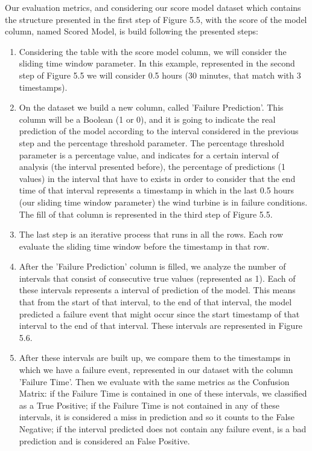 Our evaluation metrics, and considering our score model dataset which contains the structure presented in the first step of Figure 5.5, with the score of the model column, named Scored Model, is build following the presented steps:
\begin{enumerate}
    \item
Considering the table with the score model column, we will consider the sliding time window parameter. In this example, represented in the second step of Figure 5.5 we will consider 0.5 hours (30 minutes, that match with 3 timestamps).
    \item
On the dataset we build a new column, called 'Failure Prediction'. This column will be a Boolean (1 or 0), and it is going to indicate the real prediction of the model according to the interval considered in the previous step and the percentage threshold parameter.
The percentage threshold parameter is a percentage value, and indicates for a certain interval of analysis (the interval presented before), the percentage of predictions (1 values) in the interval that have to exists in order to consider that the end time of that interval represents a timestamp in which in the last 0.5 hours (our sliding time window parameter) the wind turbine is in failure conditions. The fill of that column is represented in the third step of Figure 5.5.
    \item
The last step is an iterative process that runs in all the rows. Each row evaluate the sliding time window before the timestamp in that row.
    \item
After the 'Failure Prediction' column is filled, we analyze the number of intervals that consist of consecutive true values (represented as 1). Each of these intervals represents a interval of prediction of the model. This means that from the start of that interval, to the end of that interval, the model predicted a failure event that might occur since the start timestamp of that interval to the end of that interval. These intervals are represented in Figure 5.6.
    \item
After these intervals are built up, we compare them to the timestamps in which we have a failure event, represented in our dataset with the column 'Failure Time'.
Then we evaluate with the same metrics as the Confusion Matrix: if the Failure Time is contained in one of these intervals, we classified as a True Positive; if the Failure Time is not contained in any of these intervals, it is considered a miss in prediction and so it counts to the False Negative; if the interval predicted does not contain any failure event, is a bad prediction and is considered an False Positive.
\end{enumerate}

